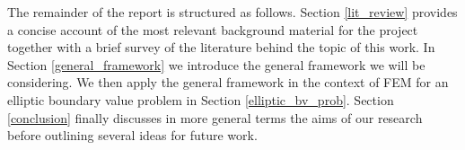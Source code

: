 The remainder of the report is structured as follows. Section \textcolor{blue}{\ref{lit_review}} provides a concise account of the most relevant background material for the project together with a brief survey of the literature behind the topic of this work. In Section \textcolor{blue}{\ref{general_framework}} we introduce the general framework we will be considering. We then apply the general framework in the context of FEM for an elliptic boundary value problem in Section \textcolor{blue}{\ref{elliptic_bv_prob}}. Section \textcolor{blue}{\ref{conclusion}} finally discusses in more general terms the aims of our research before outlining several ideas for future work.
